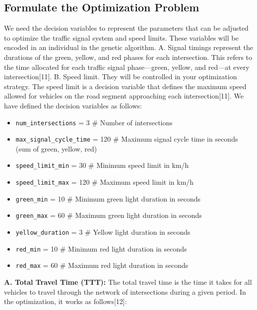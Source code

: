 \subsection{Formulate the Optimization Problem}
We need the decision variables to represent the parameters that can be adjusted to optimize the traffic signal system and speed limits. These variables will be encoded in an individual in the genetic algorithm.
\newline
\newline A. Signal timings represent the durations of the green, yellow, and red phases for each intersection. This refers to the time allocated for each traffic signal phase—green, yellow, and red—at every intersection[11].
\newline 
\newline
B. Speed limit. They will be controlled in your optimization strategy.
The speed limit is a decision variable that defines the maximum speed allowed for vehicles on the road segment approaching each intersection[11]. 
\newline
\newline
We have defined the decision variables as follows:
\begin{itemize}
    \item \texttt{num\_intersections} = 3  \hspace{0.5cm} \# Number of intersections
    \item \texttt{max\_signal\_cycle\_time} = 120  \hspace{0.5cm} \# Maximum signal cycle time in seconds (sum of green, yellow, red)
    \item \texttt{speed\_limit\_min} = 30  \hspace{0.5cm} \# Minimum speed limit in km/h
    \item \texttt{speed\_limit\_max} = 120  \hspace{0.5cm} \# Maximum speed limit in km/h
    \item \texttt{green\_min} = 10  \hspace{0.5cm} \# Minimum green light duration in seconds
    \item \texttt{green\_max} = 60  \hspace{0.5cm} \# Maximum green light duration in seconds
    \item \texttt{yellow\_duration} = 3  \hspace{0.5cm} \# Yellow light duration in seconds
    \item \texttt{red\_min} = 10  \hspace{0.5cm} \# Minimum red light duration in seconds
    \item \texttt{red\_max} = 60  \hspace{0.5cm} \# Maximum red light duration in seconds
\end{itemize}
\textbf{A. Total Travel Time (TTT):} The total travel time is the time it takes for all vehicles to travel through the network of intersections during a given period. In the optimization, it works as follows[12]:

